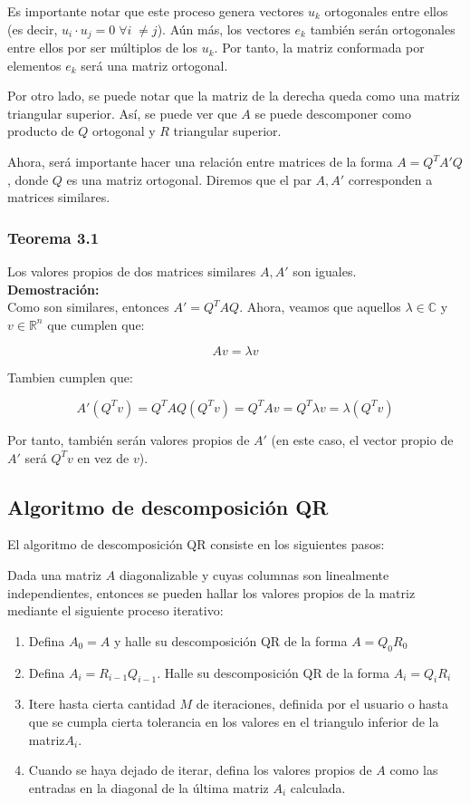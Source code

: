 Es importante notar que este proceso genera vectores $ u_k$ ortogonales entre ellos (es decir, $u_i\cdot u_j = 0 \; \forall i\; \neq j$). Aún más, los vectores $e_k$ también serán ortogonales entre ellos por ser múltiplos de los $u_k$. Por tanto, la matriz conformada por elementos $e_k$ será una matriz ortogonal.

Por otro lado, se puede notar que la matriz de la derecha queda como una matriz triangular superior. Así, se puede ver que $A$ se puede descomponer como producto de $Q$ ortogonal y $R$ triangular superior.

Ahora, será importante hacer una relación entre matrices de la forma $A = Q^TA'Q$, donde $Q$ es una matriz ortogonal. Diremos que el par $A, A'$ corresponden a matrices similares.

\subsubsection{Teorema 3.1}
 
Los valores propios de dos matrices similares $A, A'$ son iguales.\\

\textbf{Demostración:}
\\
Como son similares, entonces $A' = Q^TAQ$. Ahora, veamos que aquellos $ \lambda \in \mathbb{C} $ y $ v \in \mathbb {R}^n $ que cumplen que:

$$Av = \lambda v$$

Tambien cumplen que:

$$
A'(Q^Tv) = Q^TAQ(Q^Tv) = Q^TAv = Q^T\lambda v = \lambda (Q^Tv)
$$

Por tanto, también serán valores propios de $A'$ (en este caso, el vector propio de $A'$ será $Q^Tv$ en vez de $v$).

\subsection{Algoritmo de descomposición QR}

El algoritmo de descomposición QR consiste en los siguientes pasos:

Dada una matriz $A$ diagonalizable y cuyas columnas son linealmente independientes, entonces se pueden hallar los valores propios de la matriz mediante el siguiente proceso iterativo:

\begin{enumerate}
    \item Defina $A_0 = A$ y halle su descomposición QR de la forma $A = Q_0R_0$
    \item Defina $A_i = R_ {i-1}  Q_ {i-1} $. Halle su descomposición QR de la forma $A_i = Q_{i}R_{i} $
    \item Itere hasta cierta cantidad $M$ de iteraciones, definida por el usuario o hasta que se cumpla cierta tolerancia en los valores en el triangulo inferior de la matriz$A_i$. 
    \item Cuando se haya dejado de iterar, defina los valores propios de $A$ como las entradas en la diagonal de la última matriz $A_i$ calculada. 
\end{enumerate}

